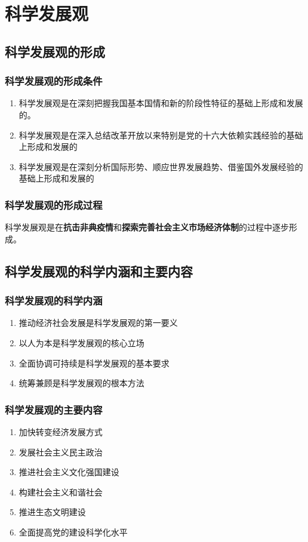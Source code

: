 \chapter{科学发展观}

\section{科学发展观的形成}
    \subsection{科学发展观的形成条件}
        \begin{enumerate}
            \item 科学发展观是在深刻把握我国基本国情和新的阶段性特征的基础上形成和发展的。
            \item 科学发展观是在深入总结改革开放以来特别是党的十六大依赖实践经验的基础上形成和发展的
            \item 科学发展观是在深刻分析国际形势、顺应世界发展趋势、借鉴国外发展经验的基础上形成和发展的
        \end{enumerate}

    \subsection{科学发展观的形成过程}
        科学发展观是在\textbf{抗击非典疫情}和\textbf{探索完善社会主义市场经济体制}的过程中逐步形成。


\section{科学发展观的科学内涵和主要内容}
    \subsection{科学发展观的科学内涵}
        \begin{enumerate}
            \item 推动经济社会发展是科学发展观的第一要义
            \item 以人为本是科学发展观的核心立场
            \item 全面协调可持续是科学发展观的基本要求
            \item 统筹兼顾是科学发展观的根本方法
        \end{enumerate}

    \subsection{科学发展观的主要内容}
        \begin{enumerate}
            \item 加快转变经济发展方式
            \item 发展社会主义民主政治
            \item 推进社会主义文化强国建设
            \item 构建社会主义和谐社会
            \item 推进生态文明建设
            \item 全面提高党的建设科学化水平
        \end{enumerate}


